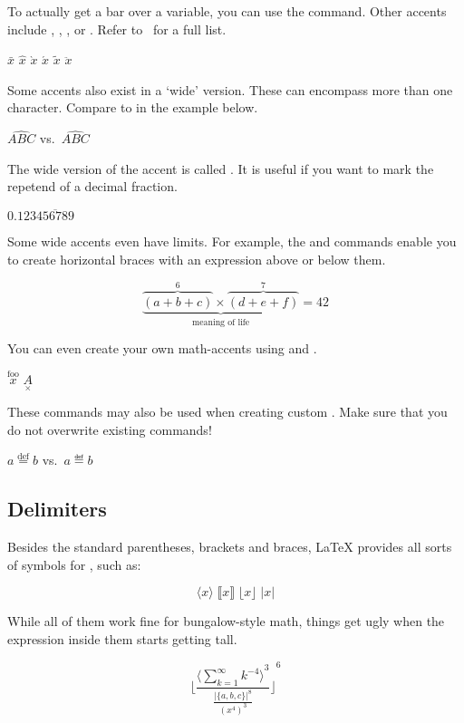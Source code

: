 To actually get a bar over a variable, you can use the  command. Other
accents include , ,
,  or . Refer to~\cite{unicode-math-symbols}
for a full list.
\begin{example}
\(\bar{x}\) \(\hat{x}\)
\(\grave{x}\) \(\acute{x}\)
\(\tilde{x}\) \(\ddot{x}\)
\end{example}

Some accents also exist in a \enquote*{wide} version. These can encompass more
than one character. Compare  to  in the example below.
\begin{example}
\(\hat{ABC}\) vs.\
\(\widehat{ABC}\)
\end{example}
The wide version of the  accent is called . It is useful
if you want to mark the repetend of a decimal fraction.
\begin{example}
\(0.123\overline{456789}\)
\end{example}

Some wide accents even have limits. For example, the  and
\csi{underbrace} commands enable you to create horizontal braces with an
expression above or below them.
\begin{example}
\[
  \underbrace{
    \overbrace{(a+b+c)}^6
    \times
    \overbrace{(d+e+f)}^7
  }_{\text{meaning of life}}=42
\]
\end{example}

You can even create your own math-accents using
 and .
\begin{example}
\(\overset{\text{foo}}{x}\)
\(\underset{\times}{A}\)
\end{example}
These commands may also be used when creating custom .
Make sure that you do not overwrite existing commands!
\begin{example}
\(a \overset{\text{def}}{=} b\)
vs.\ \(a \eqdef b\)
\end{example}

\subsection{Delimiters}\label{sec:delimiters}

Besides the standard parentheses, brackets and braces, \LaTeX{} provides all
sorts of symbols for \wi{delimiters}, such as:
\begin{example}
\[
  \langle x \rangle
  \; %
  \lBrack x \rBrack
  \; %
  \lfloor x \rfloor
  \; %
  \lvert x \rvert
\]
\end{example}
While all of them work fine for bungalow-style math, things get ugly when the
expression inside them starts getting tall.
\begin{example}[vertical_mode, examplewidth=0.8\linewidth]
\[
  {\lfloor
    \frac
    {{\langle\sum_{k=1}^{\infty} k^{-4}\rangle}^3}
    {\frac{{\lvert\{a,b,c\}\rvert}^8}{{(x^4)}^3}}
  \rfloor}^6
\]
\end{example}

